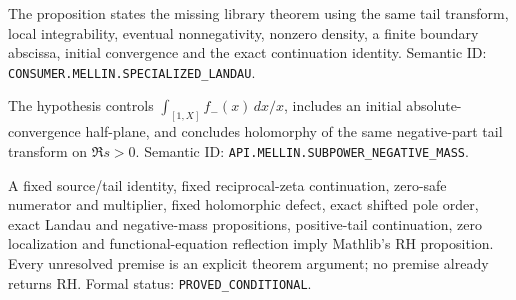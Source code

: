 \begin{theorem}
\label{thm:A-tail-landau}
\notready
The proposition
states the missing library theorem using the same tail transform,
local integrability, eventual nonnegativity, nonzero density, a finite
boundary abscissa, initial convergence and the exact continuation
identity.
Semantic ID: \texttt{CONSUMER.MELLIN.SPECIALIZED\_LANDAU}.
\end{theorem}

\begin{theorem}
\label{thm:A-negative-mass}
\notready
The hypothesis controls
\(\int_{[1,X]}f_-(x)\,dx/x\), includes an initial absolute-convergence
half-plane, and concludes holomorphy of the same negative-part tail
transform on \(\Re s>0\).
Semantic ID: \texttt{API.MELLIN.SUBPOWER\_NEGATIVE\_MASS}.
\end{theorem}

\begin{theorem}
\label{thm:A-fixed-detector-consumer}
\notready
A fixed source/tail identity, fixed reciprocal-zeta continuation,
zero-safe numerator and multiplier, fixed holomorphic defect, exact
shifted pole order, exact Landau and negative-mass propositions,
positive-tail continuation, zero localization and functional-equation
reflection imply Mathlib's RH proposition.  Every unresolved premise
is an explicit theorem argument; no premise already returns RH.
Formal status: \texttt{PROVED\_CONDITIONAL}.
\end{theorem}
